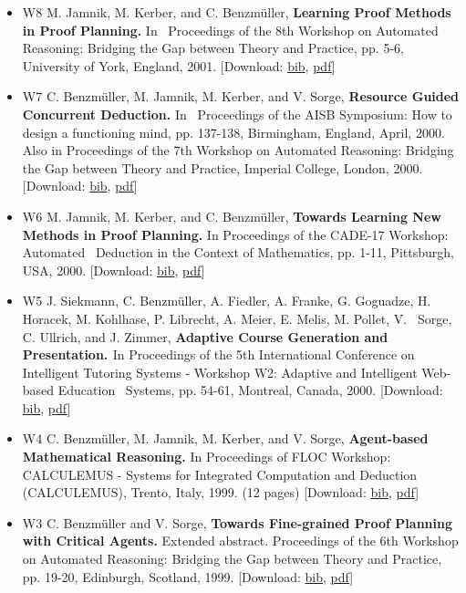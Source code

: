 \documentclass{article}
\newcommand{\tmtextbf}[1]{{\bfseries{#1}}}
\newenvironment{itemizedot}{\begin{itemize} \renewcommand{\labelitemi}{$\bullet$}\renewcommand{\labelitemii}{$\bullet$}\renewcommand{\labelitemiii}{$\bullet$}\renewcommand{\labelitemiv}{$\bullet$}}{\end{itemize}}
\begin{document}
\begin{itemizedot}
  \item [W8] {\small M. Jamnik, M. Kerber, and C. Benzm\"uller,
  \tmtextbf{Learning Proof Methods in Proof Planning.}} {\small In \
  Proceedings of the 8th Workshop on Automated Reasoning: Bridging the Gap
  between Theory and Practice, pp. 5-6, University of York, England, 2001.}
  {\color{grey} [Download: {\small \href{../papers/W8.bib}{bib},
  \href{../papers/W8.pdf}{pdf}}]}
  
  \item [W7] {\small C. Benzm\"uller, M. Jamnik, M. Kerber, and V. Sorge,
  \tmtextbf{Resource Guided Concurrent Deduction.}} {\small In \ Proceedings
  of the AISB Symposium: How to design a functioning mind, pp. 137-138,
  Birmingham, England, April, 2000. Also in Proceedings of the 7th Workshop on
  Automated Reasoning: Bridging the Gap between Theory and Practice, Imperial
  College, London, 2000.} {\color{grey} [Download: {\small
  \href{../papers/W7.bib}{bib}, \href{../papers/W7.pdf}{pdf}}]}
  
  \item [W6] {\small M. Jamnik, M. Kerber, and C. Benzm\"uller,
  \tmtextbf{Towards Learning New Methods in Proof Planning.}} {\small In
  Proceedings of the CADE-17 Workshop: Automated \ Deduction in the Context of
  Mathematics, pp. 1-11, Pittsburgh, USA, 2000.} {\color{grey} [Download:
  {\small \href{../papers/W6.bib}{bib}, \href{../papers/W6.pdf}{pdf}}]}
  
  \item [W5] {\small J. Siekmann, C. Benzm\"uller, A. Fiedler, A. Franke, G.
  Goguadze, H. Horacek, M. Kohlhase, P. Librecht, A. Meier, E. Melis, M.
  Pollet, V. \ Sorge, C. Ullrich, and J. Zimmer, \tmtextbf{Adaptive Course
  Generation and Presentation. }In Proceedings of the 5th International
  Conference on Intelligent Tutoring Systems - Workshop W2: Adaptive and
  Intelligent Web-based Education \ Systems, pp. 54-61, Montreal, Canada,
  2000.} {\color{grey} [Download: {\small \href{../papers/W5.bib}{bib},
  \href{../papers/W5.pdf}{pdf}}]}
  
  \item [W4] {\small C. Benzm\"uller, M. Jamnik, M. Kerber, and V. Sorge,
  \tmtextbf{Agent-based Mathematical Reasoning.} In Proceedings of FLOC
  Workshop: CALCULEMUS - Systems for Integrated Computation and Deduction
  (CALCULEMUS), Trento, Italy, 1999. (12 pages)} {\color{grey} [Download:
  {\small \href{../papers/W4.bib}{bib}, \href{../papers/W4.pdf}{pdf}}]}
  
  \item [W3] {\small C. Benzm\"uller and V. Sorge, \tmtextbf{Towards
  Fine-grained Proof Planning with Critical Agents.}} {\small Extended
  abstract. Proceedings of the 6th Workshop on Automated Reasoning: Bridging
  the Gap between Theory and Practice, pp. 19-20, Edinburgh, Scotland, 1999.}
  {\color{grey} [Download: {\small \href{../papers/W3.bib}{bib},
  \href{../papers/W3.pdf}{pdf}}]}
  

\end{itemizedot}
\end{document}
